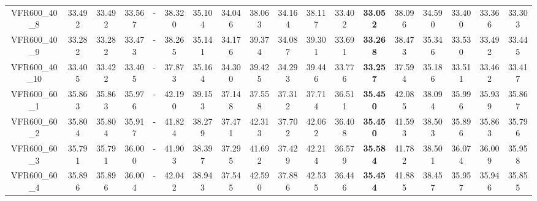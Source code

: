\begin{tabular}{cc|ccc|ccccccccccccc}
VFR600\_40\_8      & 33.492           & 33.492           & 33.567           & -                & 38.320           & 35.104           & 34.046           & 38.063           & 34.164           & 38.117           & 33.402           & {\bf 33.052}     & 38.096           & 34.590           & 33.400           & 33.366           & 33.303          \\ 
VFR600\_40\_9      & 33.282           & 33.282           & 33.473           & -                & 38.265           & 35.141           & 34.176           & 39.374           & 34.087           & 39.301           & 33.691           & {\bf 33.268}     & 38.473           & 35.346           & 33.530           & 33.492           & 33.445          \\ 
VFR600\_40\_10     & 33.405           & 33.422           & 33.405           & -                & 37.873           & 35.164           & 34.300           & 39.425           & 34.293           & 39.446           & 33.776           & {\bf 33.257}     & 37.594           & 35.186           & 33.511           & 33.462           & 33.417          \\ 
VFR600\_60\_1      & 35.863           & 35.863           & 35.976           & -                & 42.190           & 39.153           & 37.148           & 37.558           & 37.312           & 37.714           & 36.511           & {\bf 35.450}     & 42.085           & 38.094           & 35.996           & 35.939           & 35.867          \\ 
VFR600\_60\_2      & 35.804           & 35.804           & 35.917           & -                & 41.824           & 38.279           & 37.471           & 42.313           & 37.702           & 42.062           & 36.408           & {\bf 35.450}     & 41.593           & 38.503           & 35.896           & 35.863           & 35.796          \\ 
VFR600\_60\_3      & 35.791           & 35.791           & 36.000           & -                & 41.903           & 38.397           & 37.295           & 41.692           & 37.429           & 42.214           & 36.579           & {\bf 35.584}     & 41.782           & 38.501           & 36.074           & 36.009           & 35.958          \\ 
VFR600\_60\_4      & 35.896           & 35.896           & 36.004           & -                & 42.042           & 38.943           & 37.545           & 42.590           & 37.886           & 42.535           & 36.446           & {\bf 35.454}     & 41.885           & 38.457           & 35.957           & 35.946           & 35.855          \\ 

\end{tabular}
